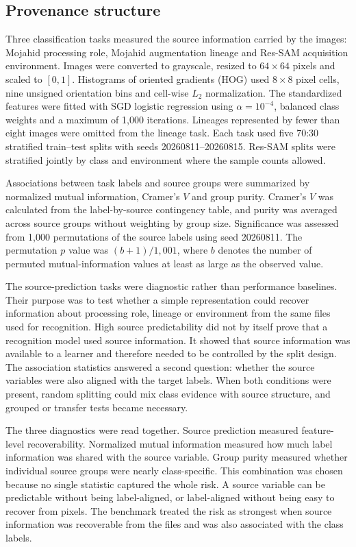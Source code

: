 \documentclass[]{interact}
\begin{document}
\subsection{Provenance structure}

Three classification tasks measured the source information carried by the images: Mojahid processing role, Mojahid augmentation lineage and Res-SAM acquisition environment. Images were converted to grayscale, resized to $64\times64$ pixels and scaled to $[0,1]$. Histograms of oriented gradients (HOG) used $8\times8$ pixel cells, nine unsigned orientation bins and cell-wise $L_2$ normalization. The standardized features were fitted with SGD logistic regression using $\alpha=10^{-4}$, balanced class weights and a maximum of 1,000 iterations. Lineages represented by fewer than eight images were omitted from the lineage task. Each task used five 70:30 stratified train--test splits with seeds 20260811--20260815. Res-SAM splits were stratified jointly by class and environment where the sample counts allowed.

Associations between task labels and source groups were summarized by normalized mutual information, Cramer's $V$ and group purity. Cramer's $V$ was calculated from the label-by-source contingency table, and purity was averaged across source groups without weighting by group size. Significance was assessed from 1,000 permutations of the source labels using seed 20260811. The permutation $p$ value was $(b+1)/1,001$, where $b$ denotes the number of permuted mutual-information values at least as large as the observed value.

The source-prediction tasks were diagnostic rather than performance baselines. Their purpose was to test whether a simple representation could recover information about processing role, lineage or environment from the same files used for recognition. High source predictability did not by itself prove that a recognition model used source information. It showed that source information was available to a learner and therefore needed to be controlled by the split design. The association statistics answered a second question: whether the source variables were also aligned with the target labels. When both conditions were present, random splitting could mix class evidence with source structure, and grouped or transfer tests became necessary.

The three diagnostics were read together. Source prediction measured feature-level recoverability. Normalized mutual information measured how much label information was shared with the source variable. Group purity measured whether individual source groups were nearly class-specific. This combination was chosen because no single statistic captured the whole risk. A source variable can be predictable without being label-aligned, or label-aligned without being easy to recover from pixels. The benchmark treated the risk as strongest when source information was recoverable from the files and was also associated with the class labels.
\end{document}
